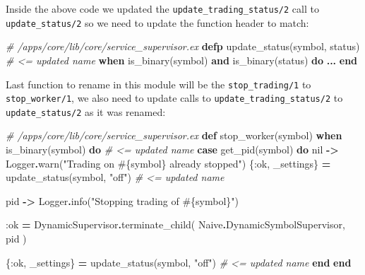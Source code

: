 \documentclass[
  oneside]{book}
\newenvironment{Shaded}{\begin{snugshade}}{\end{snugshade}}
\newcommand{\CommentTok}[1]{\textcolor[rgb]{0.56,0.35,0.01}{\textit{#1}}}
\newcommand{\ConstantTok}[1]{\textcolor[rgb]{0.00,0.00,0.00}{#1}}
\newcommand{\KeywordTok}[1]{\textcolor[rgb]{0.13,0.29,0.53}{\textbf{#1}}}
\newcommand{\NormalTok}[1]{#1}
\newcommand{\OperatorTok}[1]{\textcolor[rgb]{0.81,0.36,0.00}{\textbf{#1}}}
\newcommand{\OtherTok}[1]{\textcolor[rgb]{0.56,0.35,0.01}{#1}}
\newcommand{\StringTok}[1]{\textcolor[rgb]{0.31,0.60,0.02}{#1}}
\newcommand{\VariableTok}[1]{\textcolor[rgb]{0.00,0.00,0.00}{#1}}
\begin{document}
Inside the above code we updated the \texttt{update\_trading\_status/2} call to \texttt{update\_status/2} so we need to update the function header to match:

\begin{Shaded}
\begin{Highlighting}[]
  \CommentTok{\# /apps/core/lib/core/service\_supervisor.ex}
  \KeywordTok{defp}\NormalTok{ update\_status(symbol, status) }\CommentTok{\# \textless{}= updated name}
      \KeywordTok{when}\NormalTok{ is\_binary(symbol) }\KeywordTok{and}\NormalTok{ is\_binary(status) }\KeywordTok{do}
     \OperatorTok{...}
  \KeywordTok{end}
\end{Highlighting}
\end{Shaded}

Last function to rename in this module will be the \texttt{stop\_trading/1} to \texttt{stop\_worker/1}, we also need to update calls to \texttt{update\_trading\_status/2} to \texttt{update\_status/2} as it was renamed:

\begin{Shaded}
\begin{Highlighting}[]
  \CommentTok{\# /apps/core/lib/core/service\_supervisor.ex}
  \KeywordTok{def}\NormalTok{ stop\_worker(symbol) }\KeywordTok{when}\NormalTok{ is\_binary(symbol) }\KeywordTok{do} \CommentTok{\# \textless{}= updated name}
    \KeywordTok{case}\NormalTok{ get\_pid(symbol) }\KeywordTok{do}
      \ConstantTok{nil} \OperatorTok{{-}\textgreater{}}
        \ConstantTok{Logger}\OperatorTok{.}\NormalTok{warn(}\StringTok{"Trading on }\OtherTok{\#\{}\NormalTok{symbol}\OtherTok{\}}\StringTok{ already stopped"}\NormalTok{)}
\NormalTok{        \{}\VariableTok{:ok}\NormalTok{, \_settings\} }\OperatorTok{=}\NormalTok{ update\_status(symbol, }\StringTok{"off"}\NormalTok{) }\CommentTok{\# \textless{}= updated name}

\NormalTok{      pid }\OperatorTok{{-}\textgreater{}}
        \ConstantTok{Logger}\OperatorTok{.}\NormalTok{info(}\StringTok{"Stopping trading of }\OtherTok{\#\{}\NormalTok{symbol}\OtherTok{\}}\StringTok{"}\NormalTok{)}

        \VariableTok{:ok} \OperatorTok{=}
          \ConstantTok{DynamicSupervisor}\OperatorTok{.}\NormalTok{terminate\_child(}
            \ConstantTok{Naive}\OperatorTok{.}\ConstantTok{DynamicSymbolSupervisor}\NormalTok{,}
\NormalTok{            pid}
\NormalTok{          )}

\NormalTok{        \{}\VariableTok{:ok}\NormalTok{, \_settings\} }\OperatorTok{=}\NormalTok{ update\_status(symbol, }\StringTok{"off"}\NormalTok{) }\CommentTok{\# \textless{}= updated name}
    \KeywordTok{end}
  \KeywordTok{end}
\end{Highlighting}
\end{Shaded}
\end{document}
